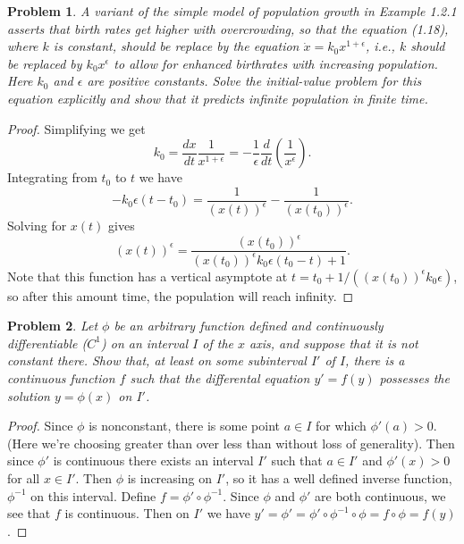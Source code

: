 \documentclass{article}
\newtheorem{problem}{Problem}
\begin{document}
\begin{problem}
A variant of the simple model of population growth in Example 1.2.1 asserts that birth rates get higher with overcrowding, so that the equation (1.18), where $k$ is constant, should be replace by the equation $\dot{x} = k_0x^{1+\epsilon}$, i.e., $k$ should be replaced by $k_0x^{\epsilon}$ to allow for enhanced birthrates with increasing population. Here $k_0$ and $\epsilon$ are positive constants. Solve the initial-value problem for this equation explicitly and show that it predicts infinite population in finite time.
\end{problem}
\begin{proof}
Simplifying we get
\[
k_0 = \frac{dx}{dt} \frac{1}{x^{1 + \epsilon}} = -\frac{1}{\epsilon} \frac{d}{dt} \left (\frac{1}{x^{\epsilon}} \right ).
\]
Integrating from $t_0$ to $t$ we have
\[
-k_0 \epsilon (t - t_0) = \frac{1}{(x(t))^{\epsilon}} - \frac{1}{(x(t_0))^{\epsilon}}.
\]
Solving for $x(t)$ gives
\[
(x(t))^{\epsilon} = \frac{(x(t_0))^{\epsilon}}{(x(t_0))^{\epsilon} k_0 \epsilon (t_0-t) + 1}.
\]
Note that this function has a vertical asymptote at $t = t_0 + 1/((x(t_0))^{\epsilon} k_0 \epsilon)$, so after this amount time, the population will reach infinity.
\end{proof}

\begin{problem}
Let $\phi$ be an arbitrary function defined and continuously differentiable ($C^1$) on an interval $I$ of the $x$ axis, and suppose that it is not constant there. Show that, at least on some subinterval $I'$ of $I$, there is a continuous function $f$ such that the differental equation $y' = f(y)$ possesses the solution $y = \phi(x)$ on $I'$.
\end{problem}
\begin{proof}
Since $\phi$ is nonconstant, there is some point $a \in I$ for which $\phi'(a) > 0$. (Here we're choosing greater than over less than without loss of generality). Then since $\phi'$ is continuous there exists an interval $I'$ such that $a \in I'$ and $\phi'(x) > 0$ for all $x \in I'$. Then $\phi$ is increasing on $I'$, so it has a well defined inverse function, $\phi^{-1}$ on this interval. Define $f = \phi' \circ \phi^{-1}$. Since $\phi$ and $\phi'$ are both continuous, we see that $f$ is continuous. Then on $I'$ we have $y' = \phi' = \phi' \circ \phi^{-1} \circ \phi = f \circ \phi = f(y)$.
\end{proof}
\end{document}
